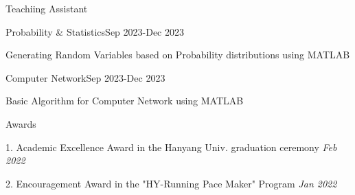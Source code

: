 \documentclass[
	11pt, %
]{resume} %
\begin{document}
\begin{rSection}{Teachiing Assistant}

	\begin{rSubsection}{Probability \& Statistics}{Sep 2023-Dec 2023}{}{}
		\item Generating Random Variables based on Probability distributions using MATLAB
	\end{rSubsection}

	\begin{rSubsection}{Computer Network}{Sep 2023-Dec 2023}{}{}
		\item Basic Algorithm for Computer Network using MATLAB
	\end{rSubsection}

\end{rSection}

\begin{rSection}{Awards}

	1. Academic Excellence Award in the Hanyang Univ. graduation ceremony \hfill \textit {Feb 2022}

	2. Encouragement Award in the "HY-Running Pace Maker" Program \hfill \textit {Jan 2022}

\end{rSection}

\end{document}
